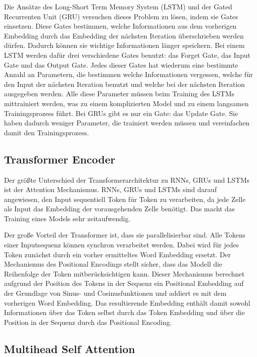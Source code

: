 Die Ansätze des Long-Short Term Memory System (LSTM) und der Gated Recurrenten Unit (GRU) versuchen dieses Problem zu lösen, indem sie Gates einsetzen.
Diese Gates bestimmen, welche Informationen aus dem vorherigen Embedding durch das Embedding der nächsten Iteration überschrieben werden dürfen.
Dadurch können sie wichtige Informationen länger speichern.
Bei einem LSTM werden dafür drei verschiedene Gates benutzt: das Forget Gate, das Input Gate und das Output Gate.
Jedes dieser Gates hat wiederum eine bestimmte Anzahl an Parametern, die bestimmen welche Informationen vergessen, welche für den Input der nächsten Iteration benutzt und welche bei der nächsten Iteration ausgegeben werden.
Alle diese Parameter müssen beim Training des LSTMs mittrainiert werden, was zu einem komplizierten Model und zu einem langsamen Trainingsprozess führt.
Bei GRUs gibt es nur ein Gate: das Update Gate.
Sie haben dadurch weniger Parameter, die trainiert werden müssen und vereinfachen damit den Trainingsprozess.
\cite{pirani2022}

\subsection{Transformer Encoder}

Der größte Unterschied der Transformerarchitektur zu RNNs, GRUs und LSTMs ist der Attention Mechanismus.
RNNs, GRUs und LSTMs sind darauf angewiesen, den Input sequentiell Token für Token zu verarbeiten, da jede Zelle als Input das Embedding der vorausgehenden Zelle benötigt.
Das macht das Training eines Models sehr zeitaufwendig.

Der große Vorteil der Transformer ist, dass sie parallelisierbar sind.
Alle Tokens einer Inputsequenz können synchron verarbeitet werden. 
Dabei wird für jedes Token zunächst durch ein vorher ermitteltes Word Embedding ersetzt.
Der Mechanismus des Positional Encodings stellt sicher, dass das Modell die Reihenfolge der Token mitberücksichtigen kann.
Dieser Mechanismus berechnet aufgrund der Position des Tokens in der Sequenz ein Positional Embedding auf der Grundlage von Sinus- und Cosinusfunktionen und addiert es mit dem vorherigen Word Embedding.
Das resultierende Embedding enthält damit sowohl Informationen über das Token selbst durch das Token Embedding und über die Position in der Sequenz durch das Positional Encoding.


\subsection{Multihead Self Attention}

